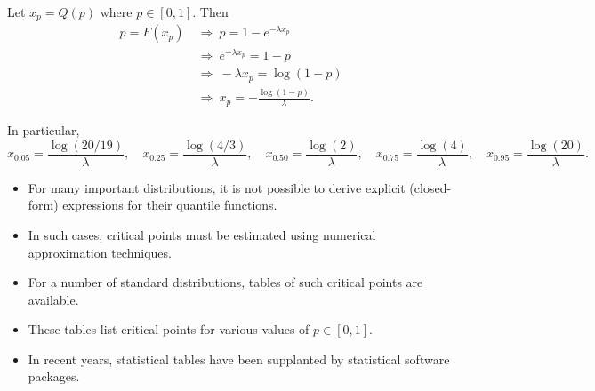 \documentclass[lecture]{csm}
\def\it{\item}
\def\bit{\begin{itemize}}
\def\eit{\end{itemize}}
\begin{document}
\begin{solution}
Let $x_p = Q(p)$ where $p\in[0,1]$. Then
\begin{align*}
p = F(x_p) 
	& \ \Rightarrow\ p = 1 - e^{-\lambda x_p} \\
	& \ \Rightarrow\ e^{-\lambda x_p} = 1 - p \\
	& \ \Rightarrow\ -\lambda x_p = \log(1 - p) \\
	& \ \Rightarrow\ x_p = -\frac{\log(1 - p)}{\lambda}.
\end{align*}

In particular,
\[
x_{0.05} = \frac{\log(20/19)}{\lambda}, \quad
x_{0.25} = \frac{\log(4/3)}{\lambda}, \quad
x_{0.50} = \frac{\log(2)}{\lambda}, \quad
x_{0.75} = \frac{\log(4)}{\lambda}, \quad
x_{0.95} = \frac{\log(20)}{\lambda}.
\]
\end{solution}
\normalsize


\begin{remark}
\bit
\it
For many important distributions, it is not possible to derive explicit (closed-form) expressions for their quantile functions. 
\it
In such cases, critical points must be estimated using numerical approximation techniques. 
\it
For a number of standard distributions, tables of such critical points are available.
\it
These tables list critical points for various values of $p\in[0,1]$.
\it 
In recent years, statistical tables have been supplanted by statistical software packages.
\eit
\end{remark}


\end{document}
